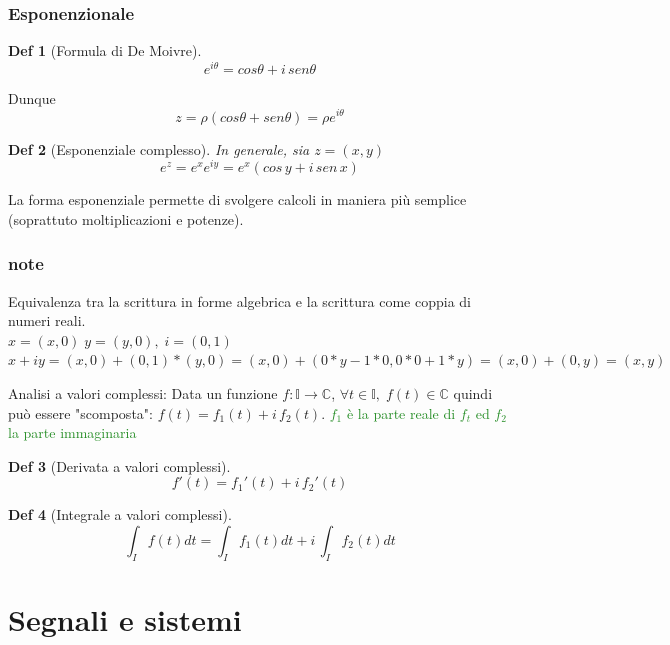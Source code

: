 \documentclass[a4paper]{article}
\newtheorem*{definition}{Def}
\newcommand{\appunto}[1]{\textcolor{ForestGreen}{#1}}
\newcommand{\C}[0]{\mathbb{C}}
\begin{document}
\subsubsection{Esponenzionale}
\begin{definition}[Formula di De Moivre]
	$$e^{i\theta} = cos\theta + i\, sen\theta$$
\end{definition}
Dunque
$$ z = \rho (cos \theta + sen \theta)=  \rho e^{i \theta}$$
\begin{definition}[Esponenziale complesso]
	In generale, sia $z = (x,y)$
	$$e^z = e^xe^{iy}=e^x(cos\,y + i \, sen\,x)$$
\end{definition}
La forma esponenziale permette di svolgere calcoli in maniera più semplice (soprattuto moltiplicazioni e potenze). 
\subsubsection{note}
Equivalenza tra la scrittura in forme algebrica e la scrittura come coppia di numeri reali.\\
$x = (x,0)\; y=(y,0),\; i=(0,1)$\\ 
$x+iy = (x,0) + (0,1)*(y,0) = (x,0) + (0*y - 1*0, 0*0 + 1*y ) = (x,0) + (0,y) = (x,y)$

Analisi a valori complessi:
Data un funzione $f: \mathbb{I} \rightarrow \C$,  $\forall t\in \mathbb{I},\; f(t)\in \C$
quindi può essere "scomposta": $f(t) = f_1(t) + i\,f_2(t)$.
\appunto{$f_1$ è la parte reale di $f_t$ ed $f_2$ la parte immaginaria}
\begin{definition}[Derivata a valori complessi]
	$$f'(t) = f_1'(t) + i\, f_2'(t)$$
\end{definition}
\begin{definition}[Integrale a valori complessi]
	$$\int_If(t) dt = \int_If_1(t) dt + i\, \int_If_2(t) dt$$
\end{definition}

\section{Segnali e sistemi}
\end{document}
